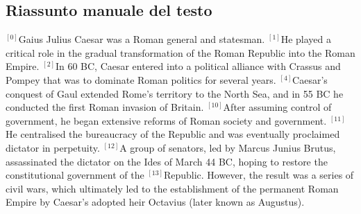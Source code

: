 \subsection*{Riassunto manuale del testo}
\begin{small}
{$^{[0]}$}Gaius Julius Caesar was a Roman general and statesman. 
{$^{[1]}$}He played a critical role in the gradual transformation of the Roman Republic into the Roman Empire.
{$^{[2]}$}In 60 BC, Caesar entered into a political alliance with Crassus and Pompey that was to dominate Roman politics for several years. 
{$^{[4]}$}Caesar's conquest of Gaul extended Rome's territory to the North Sea, and in 55 BC he conducted the first Roman invasion of Britain. 
{$^{[10]}$}After assuming control of government, he began extensive reforms of Roman society and government. 
{$^{[11]}$}He centralised the bureaucracy of the Republic and was eventually proclaimed dictator in perpetuity. 
{$^{[12]}$}A group of senators, led by Marcus Junius Brutus, assassinated the dictator on the Ides of March 44 BC, hoping to restore the constitutional government of the {$^{[13]}$}Republic. However, the result was a series of civil wars, which ultimately led to the establishment of the permanent Roman Empire by Caesar's adopted heir Octavius (later known as Augustus). 
\vfill
\end{small}


